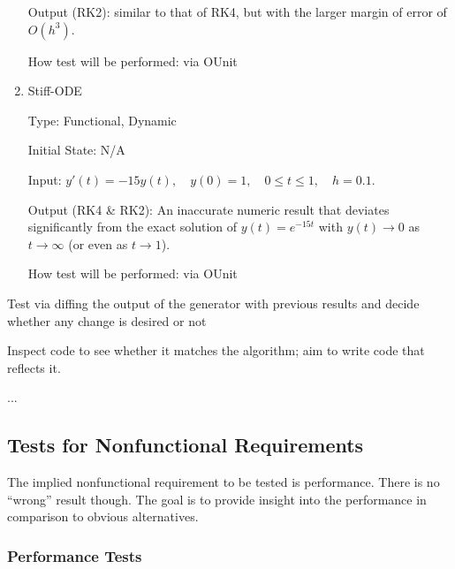 \documentclass[12pt, titlepage]{article}
\begin{document}
\begin{enumerate}
Output (RK2): similar to that of RK4, but with the larger margin of error of 
$O(h^3)$.

How test will be performed: via OUnit

\item{Stiff-ODE\\}

Type: Functional, Dynamic

Initial State: N/A

Input: $y'(t) = -15y(t),\quad  y(0) = 1, \quad 0 \leq t \leq 1, \quad h = 0.1$.

Output (RK4 \& RK2): An inaccurate numeric result that deviates significantly 
from the exact 
solution of $y(t) = e^{-15t}$ with $y(t) \rightarrow 0$ as $t \rightarrow 
\infty$ (or even as $t \rightarrow 1$).

How test will be performed: via OUnit


%
%					
%					
%					
%					

\end{enumerate}

Test via diffing the output of the generator with previous results and decide 
whether any change is desired or not

Inspect code to see whether it matches the algorithm; aim to write code that 
reflects it.  

... 

\subsection{Tests for Nonfunctional Requirements}
The implied nonfunctional requirement to be tested is performance. There is no 
``wrong'' result though. The goal is to provide insight into the performance in 
comparison to obvious alternatives.
\subsubsection{Performance Tests}
		
\end{document}
